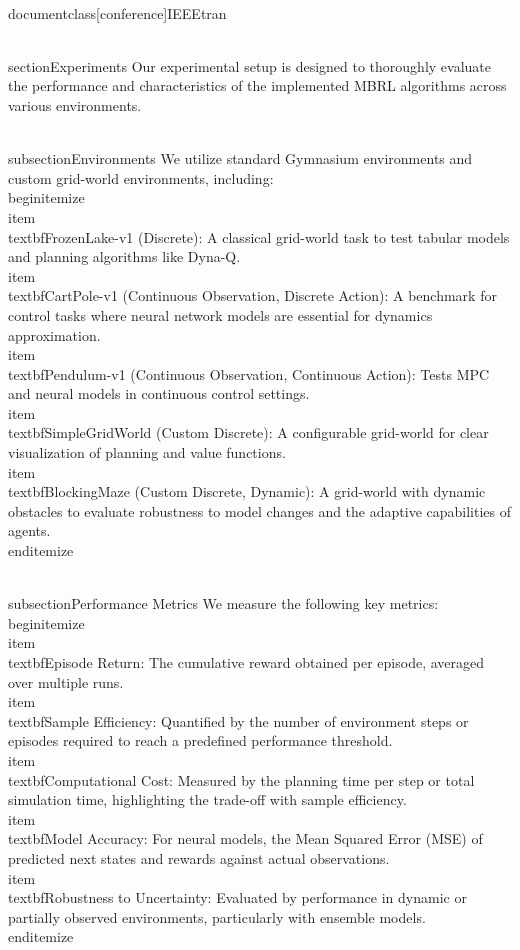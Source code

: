 \\documentclass[conference]{IEEEtran}
\begin{document}
\\section{Experiments}
Our experimental setup is designed to thoroughly evaluate the performance and characteristics of the implemented MBRL algorithms across various environments.

\\subsection{Environments}
We utilize standard Gymnasium environments and custom grid-world environments, including:
\\begin{itemize}
    \\item \\textbf{FrozenLake-v1} (Discrete): A classical grid-world task to test tabular models and planning algorithms like Dyna-Q.
    \\item \\textbf{CartPole-v1} (Continuous Observation, Discrete Action): A benchmark for control tasks where neural network models are essential for dynamics approximation.
    \\item \\textbf{Pendulum-v1} (Continuous Observation, Continuous Action): Tests MPC and neural models in continuous control settings.
    \\item \\textbf{SimpleGridWorld} (Custom Discrete): A configurable grid-world for clear visualization of planning and value functions.
    \\item \\textbf{BlockingMaze} (Custom Discrete, Dynamic): A grid-world with dynamic obstacles to evaluate robustness to model changes and the adaptive capabilities of agents.
\\end{itemize}

\\subsection{Performance Metrics}
We measure the following key metrics:
\\begin{itemize}
    \\item \\textbf{Episode Return}: The cumulative reward obtained per episode, averaged over multiple runs.
    \\item \\textbf{Sample Efficiency}: Quantified by the number of environment steps or episodes required to reach a predefined performance threshold.
    \\item \\textbf{Computational Cost}: Measured by the planning time per step or total simulation time, highlighting the trade-off with sample efficiency.
    \\item \\textbf{Model Accuracy}: For neural models, the Mean Squared Error (MSE) of predicted next states and rewards against actual observations.
    \\item \\textbf{Robustness to Uncertainty}: Evaluated by performance in dynamic or partially observed environments, particularly with ensemble models.
\\end{itemize}
\end{document}
